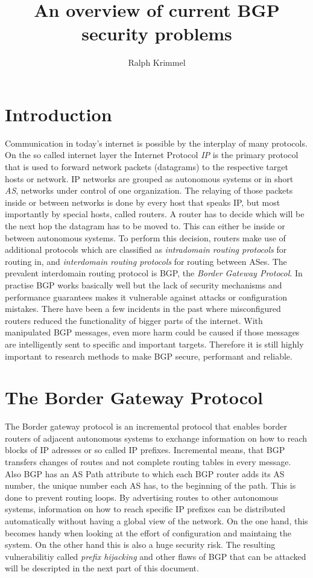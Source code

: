 \documentclass[12pt]{IEEEtran}
\author{Ralph Krimmel}
\title{An overview of current BGP security problems}
\begin{document}
	\maketitle
	\begin{abstract}
	\end{abstract}
	\section{Introduction}
	Communication in today's internet is possible by the interplay of many protocols. On the so called internet layer the Internet Protocol \emph{IP} is the primary protocol that is used to forward network packets (datagrams) to the respective target hosts or network. 
	IP networks are grouped as autonomous systems or in short \emph{AS}, networks under control of one organization. 
	The relaying of those packets inside or between networks is done by every host that speaks IP, but most importantly by special hosts, called routers. 
	A router has to decide which will be the next hop the datagram has to be moved to. 
	This can either be inside or between autonomous systems. 
	To perform this decision, routers make use of additional protocols which are classified as \emph{intradomain routing protocols} for routing in, and \emph{interdomain routing protocols} for routing between ASes. 
	The prevalent interdomain routing protocol is BGP, the \emph{Border Gateway Protocol}. 
	In practise BGP works basically well but the lack of security mechanisms and performance guarantees makes it vulnerable against attacks or configuration mistakes. 
	There have been a few incidents in the past where misconfigured routers reduced the functionality of bigger parts of the internet. 
	With manipulated BGP messages, even more harm could be caused if those messages are intelligently sent to specific and important targets. 
	Therefore it is still highly important to research methods to make BGP secure, performant and reliable. 
	\section{The Border Gateway Protocol}
	The Border gateway protocol is an incremental protocol that enables border routers of adjacent autonomous systems to exchange information on how to reach blocks of IP adresses or so called IP prefixes. 
	Incremental means, that BGP transfers changes of routes and not complete routing tables in every message.
	Also BGP has an AS Path attribute to which each BGP router adds its AS number, the unique number each AS has, to the beginning of the path. This is done to prevent routing loops. 
	By advertising routes to other autonomous systems, information on how to reach specific IP prefixes can be distributed automatically without having a global view of the network. On the one hand, this becomes handy when looking at the effort of configuration and maintaing the system. On the other hand this is also a huge security risk.
	The resulting vulnerabilitiy called \emph{prefix hijacking} and other flaws of BGP that can be attacked will be descripted in the next part of this document.
	
\end{document}
